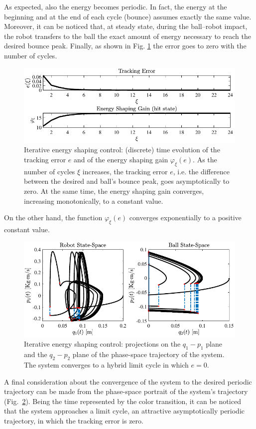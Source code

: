 As expected, also the energy becomes periodic. In fact, the energy at the beginning and at the end of each cycle (bounce) assumes exactly the same value. Moreover, it can be noticed that, at steady state, during the ball--robot impact, the robot transfers to the ball the exact amount of energy necessary to reach the desired bounce peak. Finally, as shown in Fig. \ref{fig:ctrl5} the error goes to zero with the number of cycles.
%
\begin{figure}[!ht]
	\centering
	\includegraphics[width=\linewidth]{Figures/ctrl5.pdf}
	\caption[Iterative energy shaping control: (discrete) time evolution of the tracking error $e$ and of the energy shaping gain $\varphi_\xi(e)$]{Iterative energy shaping control: (discrete) time evolution of the tracking error $e$ and of the energy shaping gain $\varphi_\xi(e)$. As the number of cycles $\xi$ increases, the tracking error $e$, i.e. the difference between the desired and ball's bounce peak, goes asymptotically to zero. At the same time, the energy shaping gain converges, increasing monotonically, to a constant value.}
	\label{fig:ctrl5}
\end{figure}
%
On the other hand, the function $\varphi_\xi(e)$ converges exponentially to a positive constant value. 
%
\begin{figure}[ht!]
	\centering
	\includegraphics[width=\linewidth]{Figures/ctrl2.pdf}
	\caption[Iterative energy shaping control: phase--space trajectories]{Iterative energy shaping control: projections on the $q_1-p_1$ plane and the $q_2-p_2$ plane of the phase-space trajectory of the system. The system converges to a hybrid limit cycle in which $e=0$.}
	\label{fig:ctrl2}
\end{figure}
%
A final consideration about the convergence of the system to the desired periodic trajectory can be made from the phase-space portrait of the system's trajectory (Fig.~\ref{fig:ctrl2}). Being the time represented by the color transition, it can be noticed that the system approaches a limit cycle, an attractive asymptotically periodic trajectory, in which the tracking error is zero.



